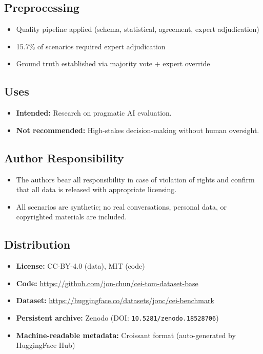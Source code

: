 \documentclass[twoside,11pt]{article}
\begin{document}
\subsection{Preprocessing}
\begin{itemize}[leftmargin=*,noitemsep]
    \item Quality pipeline applied (schema, statistical, agreement, expert adjudication)
    \item 15.7\% of scenarios required expert adjudication
    \item Ground truth established via majority vote + expert override
\end{itemize}

\subsection{Uses}
\begin{itemize}[leftmargin=*,noitemsep]
    \item \textbf{Intended:} Research on pragmatic AI evaluation.
    \item \textbf{Not recommended:} High-stakes decision-making without human oversight.
\end{itemize}

\subsection{Author Responsibility}
\begin{itemize}[leftmargin=*,noitemsep]
    \item The authors bear all responsibility in case of violation of rights and confirm that all data is released with appropriate licensing.
    \item All scenarios are synthetic; no real conversations, personal data, or copyrighted materials are included.
\end{itemize}

\subsection{Distribution}
\begin{itemize}[leftmargin=*,noitemsep]
    \item \textbf{License:} CC-BY-4.0 (data), MIT (code)
    \item \textbf{Code:} \url{https://github.com/jon-chun/cei-tom-dataset-base}
    \item \textbf{Dataset:} \url{https://huggingface.co/datasets/jonc/cei-benchmark}
    \item \textbf{Persistent archive:} Zenodo (DOI: \texttt{10.5281/zenodo.18528706})
    \item \textbf{Machine-readable metadata:} Croissant format (auto-generated by HuggingFace Hub)
\end{itemize}
\end{document}

